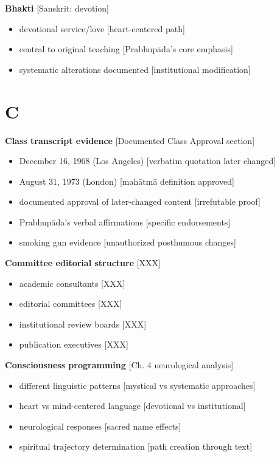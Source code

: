 \documentclass[11pt,twoside]{book}
\begin{document}
\textbf{\textbf{Bhakti}} {[}Sanskrit: devotion]
\begin{itemize}
\item devotional service/love [heart-centered path]
\item central to original teaching [Prabhupāda's core emphasis]
\item systematic alterations documented [institutional modification]
\end{itemize}
\section*{C}
\label{sec:org39ac15d}

\textbf{\textbf{Class transcript evidence}} {[}Documented Class Approval section]
\begin{itemize}
\item December 16, 1968 (Los Angeles) [verbatim quotation later changed]
\item August 31, 1973 (London) [mahātmā definition approved]
\item documented approval of later-changed content [irrefutable proof]
\item Prabhupāda's verbal affirmations [specific endorsements]
\item smoking gun evidence [unauthorized posthumous changes]
\end{itemize}

\textbf{\textbf{Committee editorial structure}} {[}XXX]
\begin{itemize}
\item academic consultants [XXX]
\item editorial committees [XXX]
\item institutional review boards [XXX]
\item publication executives [XXX]
\end{itemize}

\textbf{\textbf{Consciousness programming}} {[}Ch. 4 neurological analysis]
\begin{itemize}
\item different linguistic patterns [mystical vs systematic approaches]
\item heart vs mind-centered language [devotional vs institutional]
\item neurological responses [sacred name effects]
\item spiritual trajectory determination [path creation through text]
\end{itemize}
\end{document}
